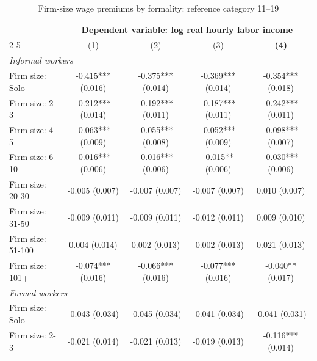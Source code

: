 \begin{table}[p]
  \centering
  \caption{Firm-size wage premiums by formality: reference category 11--19}
  \label{tab:firm-size-local-geography-formality-robustness-11-19-reference}
  \scriptsize
  \begin{tabular}{lcccc}
    \toprule
    & \multicolumn{4}{c}{Dependent variable: log real hourly labor income} \\
    \cmidrule(lr){2-5}
    & (1) & (2) & (3) & \textbf{(4)} \\
    \midrule
    \multicolumn{5}{l}{\textit{Informal workers}} \\
    Firm size: Solo & -0.415*** {\scriptsize (0.016)} & -0.375*** {\scriptsize (0.014)} & -0.369*** {\scriptsize (0.014)} & -0.354*** {\scriptsize (0.018)} \\
    Firm size: 2-3 & -0.212*** {\scriptsize (0.014)} & -0.192*** {\scriptsize (0.011)} & -0.187*** {\scriptsize (0.011)} & -0.242*** {\scriptsize (0.011)} \\
    Firm size: 4-5 & -0.063*** {\scriptsize (0.009)} & -0.055*** {\scriptsize (0.008)} & -0.052*** {\scriptsize (0.009)} & -0.098*** {\scriptsize (0.007)} \\
    Firm size: 6-10 & -0.016*** {\scriptsize (0.006)} & -0.016*** {\scriptsize (0.006)} & -0.015** {\scriptsize (0.006)} & -0.030*** {\scriptsize (0.006)} \\
    Firm size: 20-30 & -0.005 {\scriptsize (0.007)} & -0.007 {\scriptsize (0.007)} & -0.007 {\scriptsize (0.007)} & 0.010 {\scriptsize (0.007)} \\
    Firm size: 31-50 & -0.009 {\scriptsize (0.011)} & -0.009 {\scriptsize (0.011)} & -0.012 {\scriptsize (0.011)} & 0.009 {\scriptsize (0.010)} \\
    Firm size: 51-100 & 0.004 {\scriptsize (0.014)} & 0.002 {\scriptsize (0.013)} & -0.002 {\scriptsize (0.013)} & 0.021 {\scriptsize (0.013)} \\
    Firm size: 101+ & -0.074*** {\scriptsize (0.016)} & -0.066*** {\scriptsize (0.016)} & -0.077*** {\scriptsize (0.016)} & -0.040** {\scriptsize (0.017)} \\
    \midrule
    \multicolumn{5}{l}{\textit{Formal workers}} \\
    Firm size: Solo & -0.043 {\scriptsize (0.034)} & -0.045 {\scriptsize (0.034)} & -0.041 {\scriptsize (0.034)} & -0.041 {\scriptsize (0.031)} \\
    Firm size: 2-3 & -0.021 {\scriptsize (0.014)} & -0.021 {\scriptsize (0.013)} & -0.019 {\scriptsize (0.013)} & -0.116*** {\scriptsize (0.014)} \\

\end{tabular}
\end{table}
